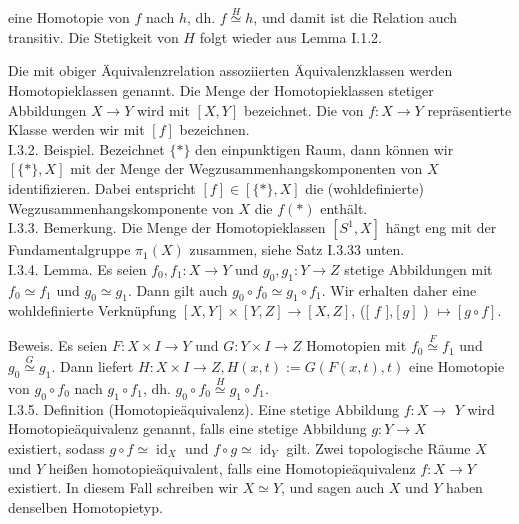 \documentclass[10pt]{article}
\begin{document}
eine Homotopie von $f$ nach $h$, dh. $f \stackrel{H}{\simeq} h$, und damit ist die Relation auch transitiv. Die Stetigkeit von $H$ folgt wieder aus Lemma I.1.2.

Die mit obiger Äquivalenzrelation assoziierten Äquivalenzklassen werden Homotopieklassen genannt. Die Menge der Homotopieklassen stetiger Abbildungen $X \rightarrow Y$ wird mit $[X, Y]$ bezeichnet. Die von $f: X \rightarrow Y$ repräsentierte Klasse werden wir mit $[f]$ bezeichnen.\\
I.3.2. Beispiel. Bezeichnet $\{*\}$ den einpunktigen Raum, dann können wir $[\{*\}, X]$ mit der Menge der Wegzusammenhangskomponenten von $X$ identifizieren. Dabei entspricht $[f] \in[\{*\}, X]$ die (wohldefinierte) Wegzusammenhangskomponente von $X$ die $f(*)$ enthält.\\
I.3.3. Bemerkung. Die Menge der Homotopieklassen $\left[S^{1}, X\right]$ hängt eng mit der Fundamentalgruppe $\pi_{1}(X)$ zusammen, siehe Satz I.3.33 unten.\\
I.3.4. Lemma. Es seien $f_{0}, f_{1}: X \rightarrow Y$ und $g_{0}, g_{1}: Y \rightarrow Z$ stetige Abbildungen mit $f_{0} \simeq f_{1}$ und $g_{0} \simeq g_{1}$. Dann gilt auch $g_{0} \circ f_{0} \simeq g_{1} \circ f_{1}$. Wir erhalten daher eine wohldefinierte Verknüpfung $[X, Y] \times[Y, Z] \rightarrow[X, Z]$, ([ $f$ ],$[g]$ ) $\mapsto[g \circ f]$.

Beweis. Es seien $F: X \times I \rightarrow Y$ und $G: Y \times I \rightarrow Z$ Homotopien mit $f_{0} \stackrel{F}{\simeq} f_{1}$ und $g_{0} \stackrel{G}{\simeq} g_{1}$. Dann liefert $H: X \times I \rightarrow Z, H(x, t):=G(F(x, t), t)$ eine Homotopie von $g_{0} \circ f_{0}$ nach $g_{1} \circ f_{1}$, dh. $g_{0} \circ f_{0} \stackrel{H}{\simeq} g_{1} \circ f_{1}$.\\
I.3.5. Definition (Homotopieäquivalenz). Eine stetige Abbildung $f: X \rightarrow$ $Y$ wird Homotopieäquivalenz genannt, falls eine stetige Abbildung $g: Y \rightarrow X$\\
existiert, sodass $g \circ f \simeq \operatorname{id}_{X}$ und $f \circ g \simeq \operatorname{id}_{Y}$ gilt. Zwei topologische Räume $X$ und $Y$ heißen homotopieäquivalent, falls eine Homotopieäquivalenz $f: X \rightarrow Y$ existiert. In diesem Fall schreiben wir $X \simeq Y$, und sagen auch $X$ und $Y$ haben denselben Homotopietyp.
\end{document}
